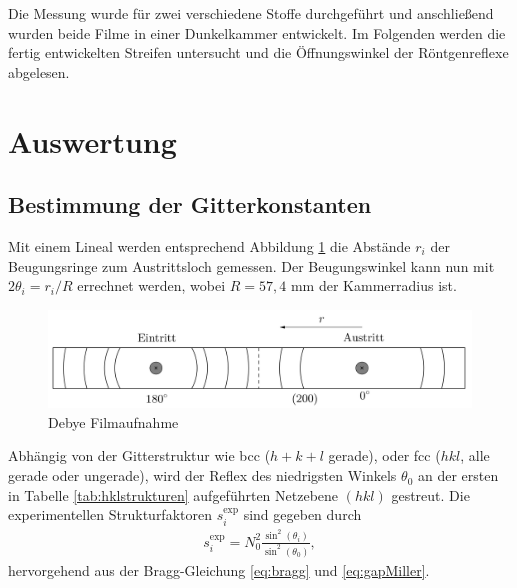 Die Messung wurde für zwei verschiedene Stoffe durchgeführt und anschließend wurden beide Filme in einer Dunkelkammer entwickelt. Im Folgenden werden die fertig entwickelten Streifen untersucht und die Öffnungswinkel der Röntgenreflexe abgelesen.  

\section{Auswertung}
\subsection{Bestimmung der Gitterkonstanten}
Mit einem Lineal werden entsprechend Abbildung \ref{pic:debyefilm} die Abstände $r_i$ der Beugungsringe zum Austrittsloch gemessen. Der 
Beugungswinkel kann nun mit $2\theta_i = r_i/R$ errechnet werden, wobei $R=57,4$ mm der Kammerradius ist. 
\begin{figure}[H]
 \includegraphics[width=\textwidth]{../pics/debyestreifen.jpg}
 \caption{Debye Filmaufnahme}
 \label{pic:debyefilm}
\end{figure}
\noindent Abhängig von der Gitterstruktur wie bcc ($h+k+l$ gerade), oder fcc ($hkl$, alle gerade oder ungerade),
wird der Reflex des niedrigsten Winkels $\theta_0$ an der ersten in Tabelle \ref{tab:hklstrukturen} aufgeführten Netzebene $(hkl)$
gestreut. 
Die experimentellen Strukturfaktoren $s^\text{exp}_i$ sind gegeben durch
\begin{align}
 s^\text{exp}_i = N^2_0 \frac{\sin^2(\theta_i)}{\sin^2(\theta_0)},
 \label{eq:structExp}
\end{align}
hervorgehend aus der Bragg-Gleichung \eqref{eq:bragg} und \eqref{eq:gapMiller}.
